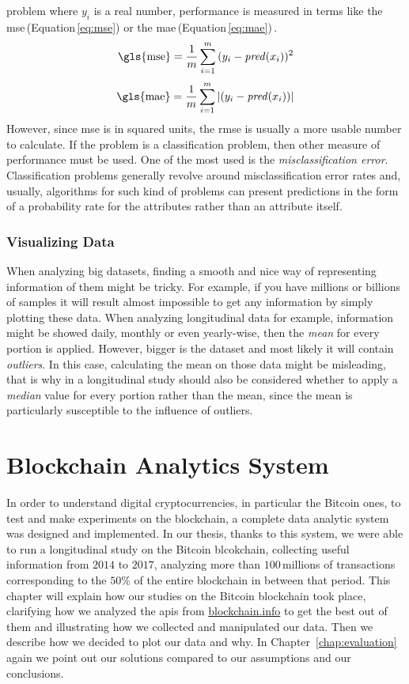 \documentclass[USenglish]{uit-thesis}
\begin{document}
problem where $y_i$ is a real number, performance is
measured in terms like the \gls{mse}\,(Equation\,\ref{eq:mse})
or the \gls{mae}\,(Equation\,\ref{eq:mae})\,\cite{bowles2015machine}.
\begin{equation}
\label{eq:mse}
\text{\gls{mse}} = \frac{1}{m}\sum_{i=1}^{m}{(y_i - \text{\emph{pred}}(x_i))^2}
\end{equation}
\begin{equation}
\label{eq:mae}
\text{\gls{mae}} = \frac{1}{m}\sum_{i=1}^{m}{|(y_i - \text{\emph{pred}}(x_i))|}
\end{equation}
However, since \gls{mse} is in squared units,
the \gls{rmse} is usually a more usable number to calculate.
If the problem is a classification problem,
then other measure of performance must be used.
One of the most used is the \emph{misclassification error}.
Classification problems generally revolve around
misclassification error rates and, usually,
algorithms for such kind of problems can
present predictions in the form of a probability
rate for the attributes rather than an attribute itself.

\subsection{Visualizing Data}
When analyzing big datasets, finding a smooth and nice way of
representing information of them might be tricky. For example, if
you have millions or billions of samples it will result
almost impossible to get any information by simply plotting these data.
When analyzing longitudinal data for example, information
might be showed daily, monthly or even yearly-wise, then the
\emph{mean} for every portion is applied. However, bigger
is the dataset and most likely it will contain \emph{outliers}.
In this case, calculating the mean on those data
might be misleading, that is why in a longitudinal study
should also be considered whether to apply a \emph{median} value
for every portion rather than the mean, since the mean is particularly
susceptible to the influence of outliers.

\chapter{Blockchain Analytics System}
\label{chap:expsetup}
In order to understand digital cryptocurrencies,
in particular the Bitcoin ones,
to test and make experiments on the blockchain, a complete data analytic
system was designed and implemented. In our thesis, thanks to
this system, we were able to run a longitudinal study
on the Bitcoin blcokchain, collecting useful
information from $2014$ to $2017$, analyzing more
than $100$\,millions of transactions corresponding
to the $50\%$ of the entire blockchain in between that period.
This chapter will explain how our studies on the Bitcoin
blockchain took place, clarifying how
we analyzed the \gls{api}s from \url{blockchain.info} to get the
best out of them and illustrating how we collected and manipulated
our data. Then we describe how we decided to plot
our data and why. In Chapter~\ref{chap:evaluation} again
we point out our solutions compared to our
assumptions and our conclusions.
\end{document}
